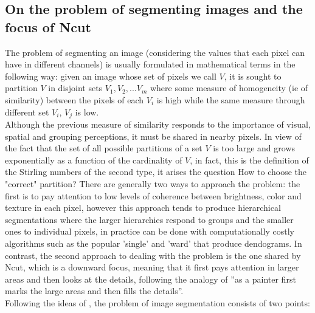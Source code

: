 \documentclass[conference]{IEEEtran}
\begin{document}
\subsection{On the problem of segmenting images and the focus of Ncut}
The problem of segmenting an image (considering the values that each pixel can have in different channels) is usually formulated in mathematical terms in the following way: given an image whose set of pixels we call $ V $, it is sought to partition $ V $ in disjoint sets $ V_1, V_2, ... V_m $ where some measure of homogeneity (ie of similarity) between the pixels of each $ V_i $ is high while the same measure through different set $ V_i $, $ V_j $ is low. \\
Although the previous measure of similarity responds to the importance of visual, spatial and grouping perceptions, it must be shared in nearby pixels. In view of the fact that the set of all possible partitions of a set $ V $ is too large and grows exponentially as a function of the cardinality of $ V $, in fact, this is the definition of the Stirling numbers of the second type, it arises the question How to choose the "correct" partition? There are generally two ways to approach the problem: the first is to pay attention to low levels of coherence between brightness, color and texture in each pixel, however this approach tends to produce hierarchical segmentations where the larger hierarchies respond to groups and the smaller ones to individual pixels, in practice can be done with computationally costly algorithms such as the popular 'single' and 'ward' that produce dendograms. In contrast, the second approach to dealing with the problem is the one shared by Ncut, which is a downward focus, meaning that it first pays attention in larger areas and then looks at the details, following the analogy of \cite{Ncut} ''as a painter first marks the large areas and then fills the details''. \\
Following the ideas of \cite{Ncut}, the problem of image segmentation consists of two points:
\end{document}
